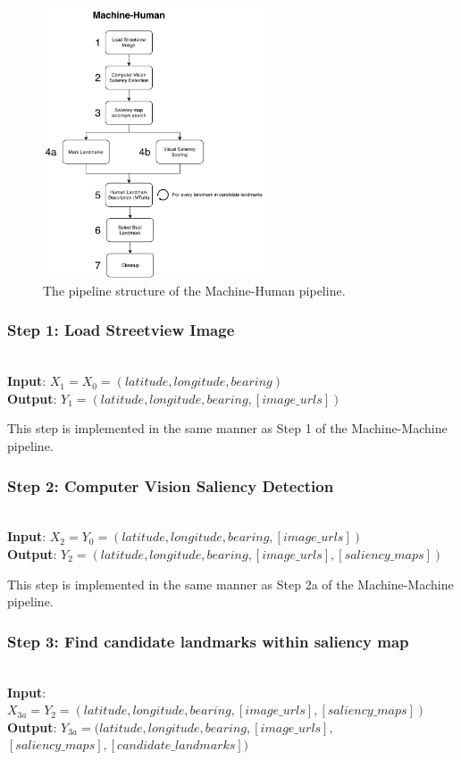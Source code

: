 \begin{figure}[htbp]
  \centering
  \includegraphics[width=0.6\textwidth]{pipeline_diagrams/machine-human.pdf}
  \caption{The pipeline structure of the Machine-Human pipeline.}
  \label{fig:pipeline:mh}
\end{figure}

\subsubsection*{Step 1: Load Streetview Image}~\\
\noindent\textbf{Input}: $X_1 = X_0 = (latitude, longitude, bearing)$\\
\textbf{Output}: $Y_1 = (latitude, longitude, bearing, [image\_urls])$

This step is implemented in the same manner as Step 1 of the Machine-Machine pipeline.

\subsubsection*{Step 2: Computer Vision Saliency Detection}~\\
\noindent\textbf{Input}: $X_2 = Y_0 = (latitude, longitude, bearing, [image\_urls])$\\
\textbf{Output}: $Y_2 = (latitude, longitude, bearing, [image\_urls], [saliency\_maps])$ 

This step is implemented in the same manner as Step 2a of the Machine-Machine pipeline.

\subsubsection*{Step 3: Find candidate landmarks within saliency map}~\\
\noindent\textbf{Input}: $X_{3a} = Y_2 = (latitude, longitude, bearing, [image\_urls], [saliency\_maps])$ \\
\textbf{Output}: $Y_{3a} = (latitude, longitude, bearing, [image\_urls],$\\$ [saliency\_maps], [candidate\_landmarks])$ 

